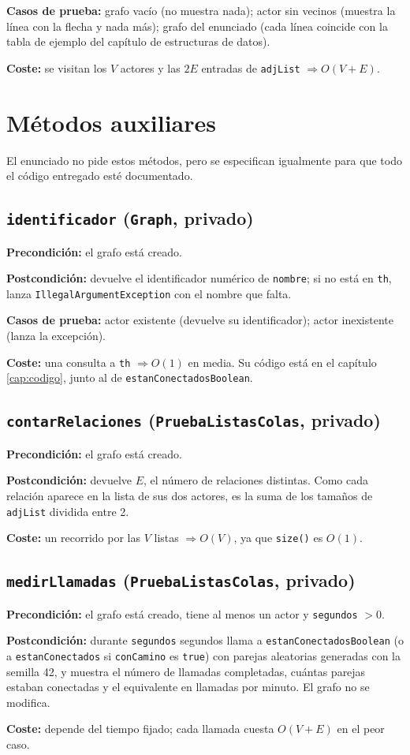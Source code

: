 \documentclass[a4paper,11pt]{report}
\newcommand{\coste}[1]{\par\noindent\textbf{Coste:} #1\par}
\newcommand{\espec}[2]{\par\noindent\textbf{Precondición:} #1\par\noindent\textbf{Postcondición:} #2\par}
\begin{document}
\noindent\textbf{Casos de prueba:} grafo vacío (no muestra nada); actor sin vecinos (muestra la línea con la flecha y nada más); grafo del enunciado (cada línea coincide con la tabla de ejemplo del capítulo de estructuras de datos).

\coste{se visitan los $V$ actores y las $2E$ entradas de \texttt{adjList} $\Rightarrow O(V+E)$.}

\section{\label{auxiliares}Métodos auxiliares}

El enunciado no pide estos métodos, pero se especifican igualmente para que todo el código entregado esté documentado.

\subsection*{\texttt{identificador} (\texttt{Graph}, privado)}
\espec{el grafo está creado.}
{devuelve el identificador numérico de \texttt{nombre}; si no está en \texttt{th}, lanza \texttt{IllegalArgumentException} con el nombre que falta.}
\noindent\textbf{Casos de prueba:} actor existente (devuelve su identificador); actor inexistente (lanza la excepción).
\coste{una consulta a \texttt{th} $\Rightarrow O(1)$ en media. Su código está en el capítulo \ref{cap:codigo}, junto al de \texttt{estan\allowbreak Conectados\allowbreak Boolean}.}

\subsection*{\texttt{contarRelaciones} (\texttt{PruebaListasColas}, privado)}
\espec{el grafo está creado.}
{devuelve $E$, el número de relaciones distintas. Como cada relación aparece en la lista de sus dos actores, es la suma de los tamaños de \texttt{adjList} dividida entre 2.}
\coste{un recorrido por las $V$ listas $\Rightarrow O(V)$, ya que \texttt{size()} es $O(1)$.}

\subsection*{\texttt{medirLlamadas} (\texttt{Prueba\allowbreak Listas\allowbreak Colas}, privado)}
\espec{el grafo está creado, tiene al menos un actor y \texttt{segundos} $> 0$.}
{durante \texttt{segundos} segundos llama a \texttt{estanConectadosBoolean} (o a \texttt{estanConectados} si \texttt{conCamino} es \texttt{true}) con parejas aleatorias generadas con la semilla 42, y muestra el número de llamadas completadas, cuántas parejas estaban conectadas y el equivalente en llamadas por minuto. El grafo no se modifica.}
\coste{depende del tiempo fijado; cada llamada cuesta $O(V+E)$ en el peor caso.}
\end{document}
